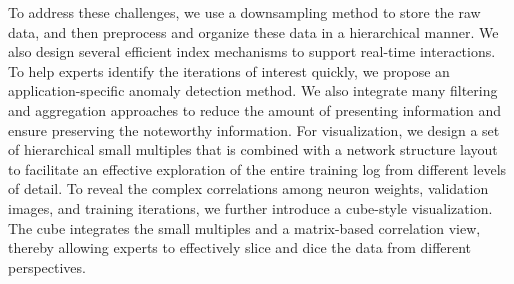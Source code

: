 \documentclass[format=acmsmall, review=false, screen=true]{acmart}
\newcommand{\ti}{\textcolor[rgb]{0,0,0}}
\begin{document}
To address these challenges, we use a downsampling method to store the raw data, and then preprocess and organize these data in a hierarchical manner.
We also design several efficient index mechanisms to support real-time interactions.
To help experts identify the iterations of interest quickly, we propose an application-specific anomaly detection method.
\ti{We also integrate many filtering and aggregation approaches to reduce the amount of presenting information and ensure preserving the noteworthy information.}
For visualization, we design a set of hierarchical small multiples that is combined with a network structure layout to facilitate an effective exploration of the entire training log from different levels of detail.
To reveal the complex correlations among neuron weights, validation images, and training iterations, we further introduce a cube-style visualization.
The cube integrates the small multiples and a matrix-based correlation view, thereby allowing experts to effectively slice and dice the data from different perspectives.
\end{document}
